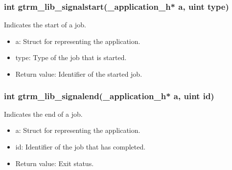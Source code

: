 \documentclass[nobiblatex]{LTHthesis}
\begin{document}
\subsubsection{int gtrm\_lib\_signalstart(\_application\_h* a, uint type)}
Indicates the start of a job.
\begin{itemize}
\item a: Struct for representing the application.
\item type: Type of the job that is started.
\item Return value: Identifier of the started job.
\end{itemize}

\subsubsection{int gtrm\_lib\_signalend(\_application\_h* a, uint id)}
Indicates the end of a job.
\begin{itemize}
\item a: Struct for representing the application.
\item id: Identifier of the job that has completed.
\item Return value: Exit status.
\end{itemize}
\end{document}
